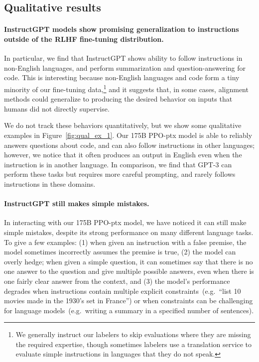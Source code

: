 \documentclass{article}
\begin{document}
\subsection{Qualitative results}
\label{sec:results-qual}

\paragraph{InstructGPT models show promising generalization to instructions outside of the RLHF fine-tuning distribution.} In particular, we find that InstructGPT shows ability to follow instructions in non-English languages, and perform summarization and question-answering for code. This is interesting because non-English languages and code form a tiny minority of our fine-tuning data,\footnote{We generally instruct our labelers to skip evaluations where they are missing the required expertise, though sometimes labelers use a translation service to evaluate simple instructions in languages that they do not speak. } and it suggests that, in some cases, alignment methods could generalize to producing the desired behavior on inputs that humans did not directly supervise.

We do not track these behaviors quantitatively, but we show some qualitative examples in Figure~\ref{fig:qual_ex_1}. Our 175B PPO-ptx model is able to reliably answers questions about code, and can also follow instructions in other languages; however, we notice that it often produces an output in English even when the instruction is in another language. In comparison, we find that GPT-3 can perform these tasks but requires more careful prompting, and rarely follows instructions in these domains.

\paragraph{InstructGPT still makes simple mistakes.} In interacting with our 175B PPO-ptx model, we have noticed it can still make simple mistakes, despite its strong performance on many different language tasks. To give a few examples: (1) when given an instruction with a false premise, the model sometimes incorrectly assumes the premise is true, (2) the model can overly hedge; when given a simple question, it can sometimes say that there is no one answer to the question and give multiple possible answers, even when there is one fairly clear answer from the context, and (3) the model's performance degrades when instructions contain multiple explicit constraints~(e.g.\ ``list 10 movies made in the 1930's set in France'') or when constraints can be challenging for language models~(e.g.\ writing a summary in a specified number of sentences).
\end{document}
